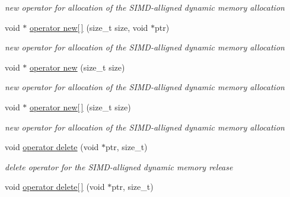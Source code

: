 \begin{DoxyCompactItemize}
\begin{DoxyCompactList}\small\item\em new operator for allocation of the S\+I\+M\+D-\/alligned dynamic memory allocation \end{DoxyCompactList}\item 
void $\ast$ \hyperlink{classKFPSimdAllocator_a45c0c288c2790a41ab7e1eb30a974747}{operator new\mbox{[}$\,$\mbox{]}} (size\+\_\+t size, void $\ast$ptr)\hypertarget{classKFPSimdAllocator_a45c0c288c2790a41ab7e1eb30a974747}{}\label{classKFPSimdAllocator_a45c0c288c2790a41ab7e1eb30a974747}

\begin{DoxyCompactList}\small\item\em new operator for allocation of the S\+I\+M\+D-\/alligned dynamic memory allocation \end{DoxyCompactList}\item 
void $\ast$ \hyperlink{classKFPSimdAllocator_aecd37d22a3328bc3ab45af85280d683f}{operator new} (size\+\_\+t size)\hypertarget{classKFPSimdAllocator_aecd37d22a3328bc3ab45af85280d683f}{}\label{classKFPSimdAllocator_aecd37d22a3328bc3ab45af85280d683f}

\begin{DoxyCompactList}\small\item\em new operator for allocation of the S\+I\+M\+D-\/alligned dynamic memory allocation \end{DoxyCompactList}\item 
void $\ast$ \hyperlink{classKFPSimdAllocator_a52963f32ee363d10045d0c99cb4bf404}{operator new\mbox{[}$\,$\mbox{]}} (size\+\_\+t size)\hypertarget{classKFPSimdAllocator_a52963f32ee363d10045d0c99cb4bf404}{}\label{classKFPSimdAllocator_a52963f32ee363d10045d0c99cb4bf404}

\begin{DoxyCompactList}\small\item\em new operator for allocation of the S\+I\+M\+D-\/alligned dynamic memory allocation \end{DoxyCompactList}\item 
void \hyperlink{classKFPSimdAllocator_ab8878f29f6745fbf3dae25598fb7fe01}{operator delete} (void $\ast$ptr, size\+\_\+t)\hypertarget{classKFPSimdAllocator_ab8878f29f6745fbf3dae25598fb7fe01}{}\label{classKFPSimdAllocator_ab8878f29f6745fbf3dae25598fb7fe01}

\begin{DoxyCompactList}\small\item\em delete operator for the S\+I\+M\+D-\/alligned dynamic memory release \end{DoxyCompactList}\item 
void \hyperlink{classKFPSimdAllocator_acb81e29329e6a990cbcd4c82a8c72491}{operator delete\mbox{[}$\,$\mbox{]}} (void $\ast$ptr, size\+\_\+t)\hypertarget{classKFPSimdAllocator_acb81e29329e6a990cbcd4c82a8c72491}{}\label{classKFPSimdAllocator_acb81e29329e6a990cbcd4c82a8c72491}


\end{DoxyCompactItemize}
